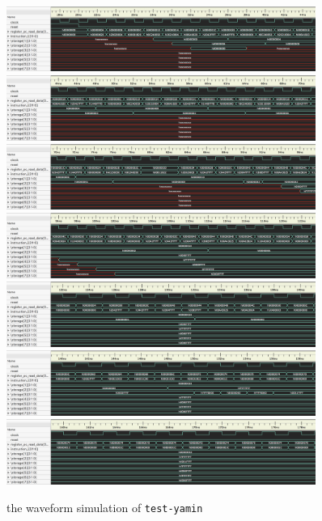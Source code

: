 \documentclass{article}
\begin{document}
\begin{figure}[!h]
\begin{center}
\includegraphics[width=0.9\textwidth]{image/test-yamin-1}
\includegraphics[width=0.9\textwidth]{image/test-yamin-2}
\includegraphics[width=0.9\textwidth]{image/test-yamin-3}
\includegraphics[width=0.9\textwidth]{image/test-yamin-4}
\includegraphics[width=0.9\textwidth]{image/test-yamin-5}
\includegraphics[width=0.9\textwidth]{image/test-yamin-6}
\includegraphics[width=0.9\textwidth]{image/test-yamin-7}
\caption{the waveform simulation of \texttt{test-yamin}}
\end{center}
\end{figure}
\end{document}
